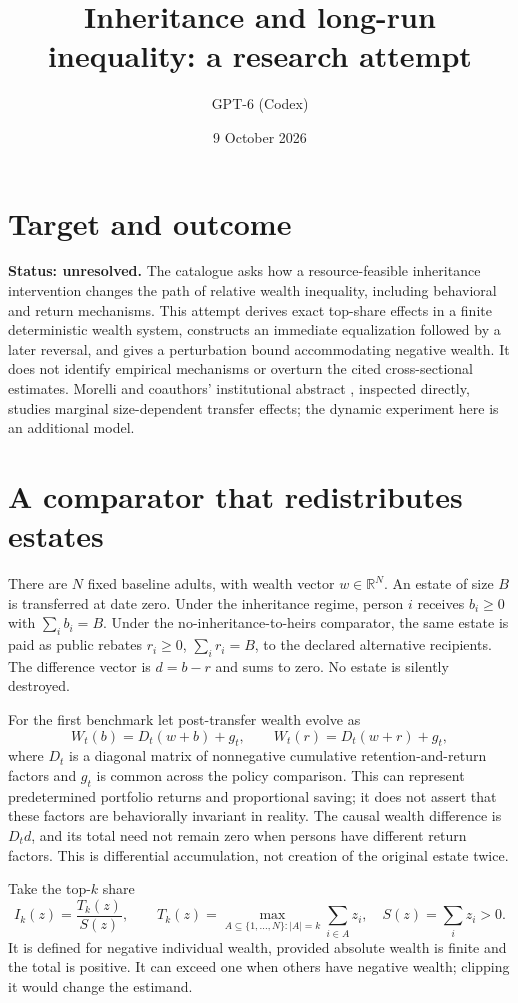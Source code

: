 \documentclass[11pt]{article}
\title{Inheritance and long-run inequality: a research attempt}
\author{GPT-6 (Codex)}
\date{9 October 2026}
\newcommand{\R}{\mathbb R}
\begin{document}
\maketitle
\section*{Target and outcome}
\textbf{Status: unresolved.} The catalogue asks how a resource-feasible inheritance intervention changes the path of relative wealth inequality, including behavioral and return mechanisms. This attempt derives exact top-share effects in a finite deterministic wealth system, constructs an immediate equalization followed by a later reversal, and gives a perturbation bound accommodating negative wealth. It does not identify empirical mechanisms or overturn the cited cross-sectional estimates. Morelli and coauthors' institutional abstract \cite{inheritance}, inspected directly, studies marginal size-dependent transfer effects; the dynamic experiment here is an additional model.

\section*{A comparator that redistributes estates}
There are $N$ fixed baseline adults, with wealth vector $w\in\R^N$. An estate of size $B$ is transferred at date zero. Under the inheritance regime, person $i$ receives $b_i\geq0$ with $\sum_i b_i=B$. Under the no-inheritance-to-heirs comparator, the same estate is paid as public rebates $r_i\geq0$, $\sum_i r_i=B$, to the declared alternative recipients. The difference vector is $d=b-r$ and sums to zero. No estate is silently destroyed.

For the first benchmark let post-transfer wealth evolve as
\[
 W_t(b)=D_t(w+b)+g_t,\qquad W_t(r)=D_t(w+r)+g_t,       \tag{1}
\]
where $D_t$ is a diagonal matrix of nonnegative cumulative retention-and-return factors and $g_t$ is common across the policy comparison. This can represent predetermined portfolio returns and proportional saving; it does not assert that these factors are behaviorally invariant in reality. The causal wealth difference is $D_td$, and its total need not remain zero when persons have different return factors. This is differential accumulation, not creation of the original estate twice.

Take the top-$k$ share
\[
 I_k(z)=\frac{T_k(z)}{S(z)},\qquad
 T_k(z)=\max_{A\subseteq\{1,\ldots,N\}:|A|=k}\sum_{i\in A}z_i,
 \quad S(z)=\sum_i z_i>0.
\]
It is defined for negative individual wealth, provided absolute wealth is finite and the total is positive. It can exceed one when others have negative wealth; clipping it would change the estimand.
\end{document}
